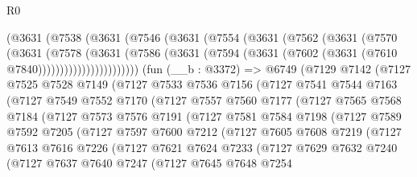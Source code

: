 \begin{lexlean}{R0}
\begin{coremodule}
          (@3631
            (@7538
              (@3631
                (@7546
                  (@3631
                    (@7554
                      (@3631
                        (@7562
                          (@3631
                            (@7570
                              (@3631
                                (@7578
                                  (@3631
                                    (@7586
                                      (@3631
                                        (@7594
                                          (@3631 (@7602 (@3631 (@7610 @7840)))))))))))))))))))))))
    (fun (__b : @3372) =>
    @6749
      (@7129
        @7142
        (@7127
          @7525
          @7528
          @7149
          (@7127
            @7533
            @7536
            @7156
            (@7127
              @7541
              @7544
              @7163
              (@7127
                @7549
                @7552
                @7170
                (@7127
                  @7557
                  @7560
                  @7177
                  (@7127
                    @7565
                    @7568
                    @7184
                    (@7127
                      @7573
                      @7576
                      @7191
                      (@7127
                        @7581
                        @7584
                        @7198
                        (@7127
                          @7589
                          @7592
                          @7205
                          (@7127
                            @7597
                            @7600
                            @7212
                            (@7127
                              @7605
                              @7608
                              @7219
                              (@7127
                                @7613
                                @7616
                                @7226
                                (@7127
                                  @7621
                                  @7624
                                  @7233
                                  (@7127
                                    @7629
                                    @7632
                                    @7240
                                    (@7127
                                      @7637
                                      @7640
                                      @7247
                                      (@7127
                                        @7645
                                        @7648
                                        @7254

\end{coremodule}
\end{lexlean}
